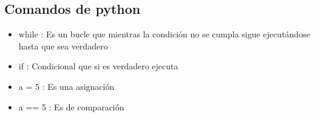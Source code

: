 \documentclass{book}
\begin{document}
	\subsection {Comandos de python}%
	\begin{itemize}%
		\item while : Es un bucle que mientras la condición no se cumpla sigue ejecutándose hasta que sea verdadero
		\item if : Condicional que si es verdadero ejecuta
		\item a = 5 : Es una asignación
		\item a == 5 : Es de comparación
		
		
		
	\end{itemize}%
\end{document}
